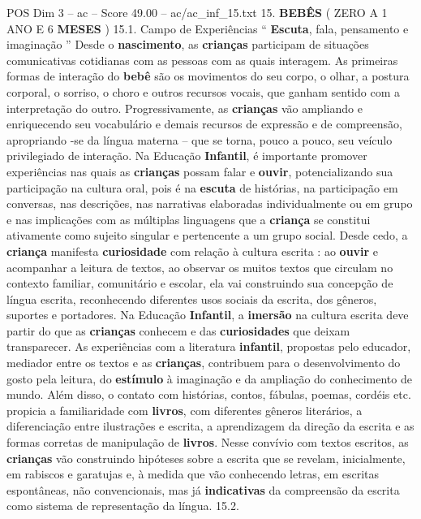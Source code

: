 \begin{textsample}{POS Dim 3 – ac – Score 49.00 – ac/ac\_inf\_15.txt}  \label{ex:f3_pos_027}
15. \textbf{BEBÊS} ( ZERO A 1 ANO E 6 \textbf{MESES} ) 15.1.
Campo de Experiências “ \textbf{Escuta}, fala, pensamento e imaginação ” Desde o \textbf{nascimento}, as \textbf{crianças} participam de situações comunicativas cotidianas com as pessoas com as quais interagem.
As primeiras formas de interação do \textbf{bebê} são os movimentos do seu corpo, o olhar, a postura corporal, o sorriso, o choro e outros recursos vocais, que ganham sentido com a interpretação do outro.
Progressivamente, as \textbf{crianças} vão ampliando e enriquecendo seu vocabulário e demais recursos de expressão e de compreensão, apropriando -se da língua materna – que se torna, pouco a pouco, seu veículo privilegiado de interação.
Na Educação \textbf{Infantil}, é importante promover experiências nas quais as \textbf{crianças} possam falar e \textbf{ouvir}, potencializando sua participação na cultura oral, pois é na \textbf{escuta} de histórias, na participação em conversas, nas descrições, nas narrativas elaboradas individualmente ou em grupo e nas implicações com as múltiplas linguagens que a \textbf{criança} se constitui ativamente como sujeito singular e pertencente a um grupo social.
Desde cedo, a \textbf{criança} manifesta \textbf{curiosidade} com relação à cultura escrita : ao \textbf{ouvir} e acompanhar a leitura de textos, ao observar os muitos textos que circulam no contexto familiar, comunitário e escolar, ela vai construindo sua concepção de língua escrita, reconhecendo diferentes usos sociais da escrita, dos gêneros, suportes e portadores.
Na Educação \textbf{Infantil}, a \textbf{imersão} na cultura escrita deve partir do que as \textbf{crianças} conhecem e das \textbf{curiosidades} que deixam transparecer.
As experiências com a literatura \textbf{infantil}, propostas pelo educador, mediador entre os textos e as \textbf{crianças}, contribuem para o desenvolvimento do gosto pela leitura, do \textbf{estímulo} à imaginação e da ampliação do conhecimento de mundo.
Além disso, o contato com histórias, contos, fábulas, poemas, cordéis etc. propicia a familiaridade com \textbf{livros}, com diferentes gêneros literários, a diferenciação entre ilustrações e escrita, a aprendizagem da direção da escrita e as formas corretas de manipulação de \textbf{livros}.
Nesse convívio com textos escritos, as \textbf{crianças} vão construindo hipóteses sobre a escrita que se revelam, inicialmente, em rabiscos e garatujas e, à medida que vão conhecendo letras, em escritas espontâneas, não convencionais, mas já \textbf{indicativas} da compreensão da escrita como sistema de representação da língua. 15.2.

\end{textsample}
